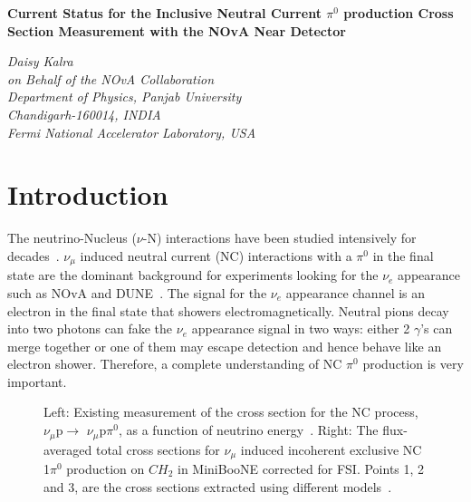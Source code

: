 \documentclass[12pt]{article}
\def\Title#1{\begin{center} {\Large {\bf #1} } \end{center}}
\begin{document}
\Title{Current Status for the Inclusive Neutral Current $\pi^{0}$ production Cross Section Measurement with the NOvA Near Detector}

\bigskip\bigskip


\begin{raggedright}  

{\it Daisy Kalra\\
on Behalf of the NOvA Collaboration\\
Department of Physics, Panjab University\\
Chandigarh-160014, INDIA\\
Fermi National Accelerator Laboratory, USA\\
}


\bigskip\bigskip
\end{raggedright}

\section{Introduction}
The neutrino-Nucleus ($\nu$-N) interactions have been studied intensively for decades~\cite{Deborah}. $\nu_{\mu}$ induced neutral current (NC) interactions with a $\pi^{0}$ in the final state are the dominant background for experiments looking for the $\nu_{e}$ appearance such as NOvA and DUNE~\cite{Kevin}. The signal for the $\nu_{e}$ appearance channel is an electron in the final state that showers electromagnetically. Neutral pions decay into two photons can fake the $\nu_{e}$ appearance signal in two ways: either 2 $\gamma$'s can merge together or one of them may escape detection and hence behave like an electron shower. Therefore, a complete understanding of NC $\pi^{0}$ production is very important. 


\begin{figure}[htb]
\begin{center}
\caption{Left: Existing measurement of the cross section for the NC process, $\nu_{\mu}$p$\rightarrow$ $\nu_{\mu}$p$\pi^{0}$, as a function of neutrino energy~\cite{Formaggio}. Right: The flux-averaged total cross sections for $\nu_{\mu}$ induced incoherent exclusive NC 1$\pi^{0}$ production on $CH_{2}$ in MiniBooNE corrected for FSI. Points 1, 2 and 3, are the cross sections extracted using different models~\cite{Arevalo}. }
\label{fig:ncpi0data}
\end{center}
\end{figure}
\end{document}
